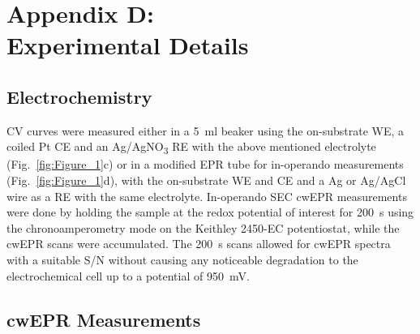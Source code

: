\chapter*{Appendix D:\\Experimental Details}
\label{Experimental_Section}

\section*{Electrochemistry}
\par
CV curves were measured either in a 5~ml beaker using the on-substrate WE, a coiled Pt CE and an Ag/AgNO\textsubscript{3} RE with the above mentioned electrolyte (Fig.~\ref{fig:Figure_1}c) or in a modified EPR tube for in-operando measurements (Fig.~\ref{fig:Figure_1}d), with the on-substrate WE and CE and a Ag or Ag/AgCl wire as a RE with the same electrolyte. In-operando SEC cwEPR measurements were done by holding the sample at the redox potential of interest for 200~s using the chronoamperometry mode on the Keithley 2450-EC potentiostat, while the cwEPR scans were accumulated. The 200~s scans allowed for cwEPR spectra with a suitable S/N without causing any noticeable degradation to the electrochemical cell up to a potential of 950~mV.



\section*{cwEPR Measurements}

